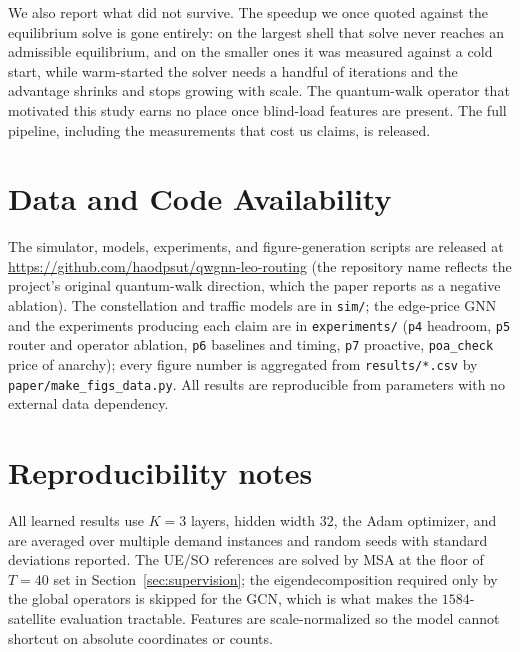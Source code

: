 \documentclass[journal]{IEEEtran}
\begin{document}
We also report what did not survive. The speedup we once quoted against the equilibrium solve is gone entirely: on the largest shell that solve never reaches an admissible equilibrium, and on the smaller ones it was measured against a cold start, while warm-started the solver needs a handful of iterations and the advantage shrinks and stops growing with scale. The quantum-walk operator that motivated this study earns no place once blind-load features are present. The full pipeline, including the measurements that cost us claims, is released.

\section*{Data and Code Availability}
The simulator, models, experiments, and figure-generation scripts are released at
\url{https://github.com/haodpsut/qwgnn-leo-routing} (the repository name reflects the
project's original quantum-walk direction, which the paper reports as a negative ablation). The constellation and traffic models
are in \texttt{sim/}; the edge-price GNN and the experiments producing each claim are in
\texttt{experiments/} (\texttt{p4} headroom, \texttt{p5} router and operator ablation,
\texttt{p6} baselines and timing, \texttt{p7} proactive, \texttt{poa\_check} price of
anarchy); every figure number is
aggregated from \texttt{results/*.csv} by \texttt{paper/make\_figs\_data.py}. All results
are reproducible from parameters with no external data dependency.

\appendices
\section{Reproducibility notes}
All learned results use $K{=}3$ layers, hidden width $32$, the Adam optimizer, and are
averaged over multiple demand instances and random seeds with standard deviations
reported. The UE/SO references are solved by MSA at the floor of $T{=}40$ set in Section~\ref{sec:supervision}; the eigendecomposition
required only by the global operators is skipped for the GCN, which is what makes the
$1584$-satellite evaluation tractable. Features are scale-normalized so the model cannot
shortcut on absolute coordinates or counts.
\end{document}
